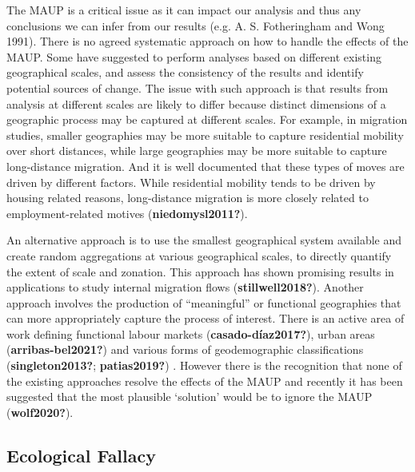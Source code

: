 \documentclass[
  letterpaper,
  krantz2]{style/krantz}
\begin{document}
The MAUP is a critical issue as it can impact our analysis and thus any
conclusions we can infer from our results (e.g. A. S. Fotheringham and
Wong 1991). There is no agreed systematic approach on how to handle the
effects of the MAUP. Some have suggested to perform analyses based on
different existing geographical scales, and assess the consistency of
the results and identify potential sources of change. The issue with
such approach is that results from analysis at different scales are
likely to differ because distinct dimensions of a geographic process may
be captured at different scales. For example, in migration studies,
smaller geographies may be more suitable to capture residential mobility
over short distances, while large geographies may be more suitable to
capture long-distance migration. And it is well documented that these
types of moves are driven by different factors. While residential
mobility tends to be driven by housing related reasons, long-distance
migration is more closely related to employment-related motives
(\textbf{niedomysl2011?}).

An alternative approach is to use the smallest geographical system
available and create random aggregations at various geographical scales,
to directly quantify the extent of scale and zonation. This approach has
shown promising results in applications to study internal migration
flows (\textbf{stillwell2018?}). Another approach involves the
production of ``meaningful'' or functional geographies that can more
appropriately capture the process of interest. There is an active area
of work defining functional labour markets (\textbf{casado-díaz2017?}),
urban areas (\textbf{arribas-bel2021?}) and various forms of
geodemographic classifications (\textbf{singleton2013?};
\textbf{patias2019?}) . However there is the recognition that none of
the existing approaches resolve the effects of the MAUP and recently it
has been suggested that the most plausible `solution' would be to ignore
the MAUP (\textbf{wolf2020?}).

\hypertarget{ecological-fallacy}{%
\subsection{Ecological Fallacy}\label{ecological-fallacy}}
\end{document}
